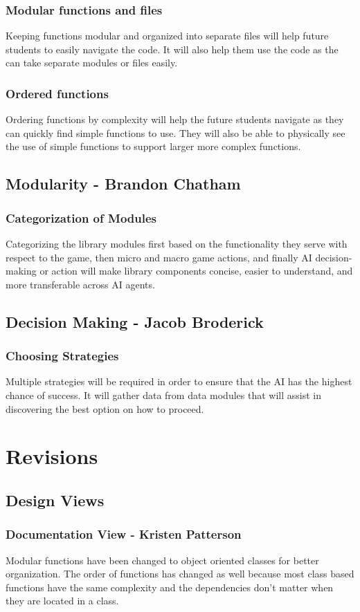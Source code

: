 \documentclass[10pt,letterpaper,onecolumn,draftclsnofoot]{IEEEtran}
\begin{document}
\subsubsection{Modular functions and files}
	Keeping functions modular and organized into separate files will help future students to easily navigate the code. It will also help them use the code as the can take separate modules or files easily.

\subsubsection{Ordered functions}
	Ordering functions by complexity will help the future students navigate as they can quickly find simple functions to use. They will also be able to physically see the use of simple functions to support larger more complex functions.
\subsection{Modularity - Brandon Chatham}
\subsubsection{Categorization of Modules}
	Categorizing the library modules first based on the functionality they serve with respect to the game, then micro and macro game actions, and finally AI decision-making or action will make library components concise, easier to understand, and more transferable across AI agents.
\subsection{Decision Making - Jacob Broderick}
\subsubsection{Choosing Strategies}
	Multiple strategies will be required in order to ensure that the AI has the highest chance of success. It will gather data from data modules that will assist in discovering the best option on how to proceed. 

\section{Revisions}
\subsection{Design Views}
\subsubsection{Documentation View - Kristen Patterson}
Modular functions have been changed to object oriented classes for better organization. The order of functions has changed as well because most class based functions have the same complexity and the dependencies don't matter when they are located in a class.
\end{document}
